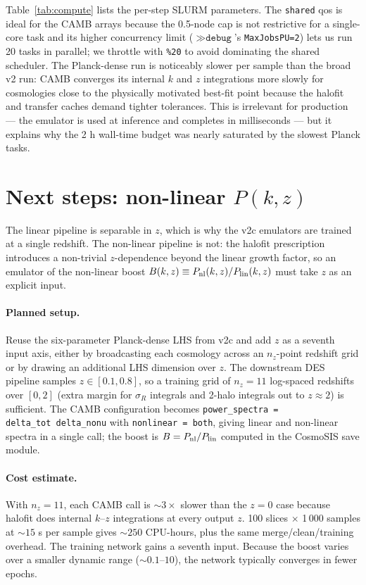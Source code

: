 \documentclass[11pt]{article}
\begin{document}
Table~\ref{tab:compute} lists the per-step SLURM parameters. The
\texttt{shared} qos is ideal for the CAMB arrays because the 0.5-node
cap is not restrictive for a single-core task and its higher
concurrency limit ($\gg \texttt{debug}$'s \texttt{MaxJobsPU=2}) lets
us run 20 tasks in parallel; we throttle with \texttt{\%20} to avoid
dominating the shared scheduler. The Planck-dense run is noticeably
slower per sample than the broad v2 run: CAMB converges its internal
$k$ and $z$ integrations more slowly for cosmologies close to the
physically motivated best-fit point because the halofit and transfer
caches demand tighter tolerances. This is irrelevant for production
--- the emulator is used at inference and completes in milliseconds
--- but it explains why the 2 h wall-time budget was nearly saturated
by the slowest Planck tasks.

\section{Next steps: non-linear $P(k, z)$}
\label{sec:next}

The linear pipeline is separable in $z$, which is why the v2c
emulators are trained at a single redshift. The non-linear pipeline
is not: the halofit prescription introduces a non-trivial
$z$-dependence beyond the linear growth factor, so an emulator of
the non-linear boost
$B(k, z) \equiv P_{\rm nl}(k, z) / P_{\rm lin}(k, z)$ must take $z$
as an explicit input.

\paragraph{Planned setup.} Reuse the six-parameter Planck-dense LHS
from v2c and add $z$ as a seventh input axis, either by broadcasting
each cosmology across an $n_z$-point redshift grid or by drawing an
additional LHS dimension over $z$. The downstream DES pipeline
samples $z \in [0.1, 0.8]$, so a training grid of $n_z = 11$
log-spaced redshifts over $[0, 2]$ (extra margin for $\sigma_R$
integrals and 2-halo integrals out to $z \approx 2$) is sufficient.
The CAMB configuration becomes
\texttt{power\_spectra = delta\_tot\ delta\_nonu} with
\texttt{nonlinear = both}, giving linear and non-linear spectra in a
single call; the boost is $B = P_{\rm nl}/P_{\rm lin}$ computed in
the CosmoSIS save module.

\paragraph{Cost estimate.} With $n_z = 11$, each CAMB call is
$\sim 3\times$ slower than the $z=0$ case because halofit does
internal $k$--$z$ integrations at every output $z$.
100 slices $\times$ 1\,000 samples at $\sim 15$ s per sample gives
$\sim 250$ CPU-hours, plus the same merge/clean/training overhead.
The training network gains a seventh input. Because the boost varies
over a smaller dynamic range ($\sim 0.1$--$10$), the network
typically converges in fewer epochs.
\end{document}
